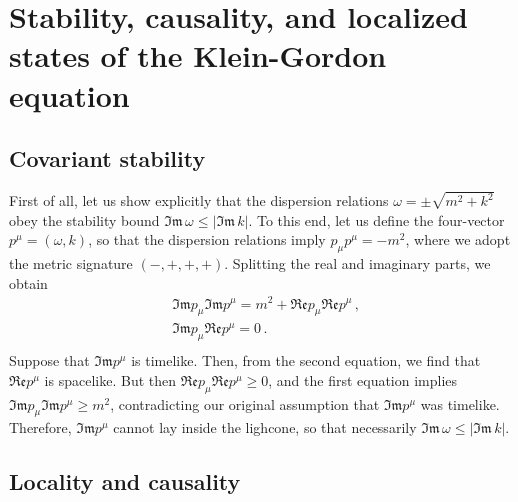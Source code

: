 \documentclass[prl, amsfonts, amssymb, amsmath, nofootinbib,reprint, showkeys, twoside,notitlepage]{revtex4-2}
\theoremstyle{definition}
\theoremstyle{theorem}
\theoremstyle{corollary}
\begin{document}
\newpage


\section{Stability, causality, and localized states of the Klein-Gordon equation}

\subsection{Covariant stability}

First of all, let us show explicitly that the dispersion relations $\omega{=}\pm \sqrt{m^2{+}k^2}$ obey the stability bound $\mathfrak{Im} \, \omega \leq |\mathfrak{Im} \, k|$. To this end, let us define the four-vector $p^\mu =(\omega,k)$, so that the dispersion relations imply $p_\mu p^\mu=-m^2$, where we adopt the metric signature $(-,+,+,+)$. Splitting the real and imaginary parts, we obtain
\begin{equation}
\begin{split}
& \mathfrak{Im}p_\mu \mathfrak{Im}p^\mu =m^2+\mathfrak{Re}p_\mu \mathfrak{Re}p^\mu \, ,  \\
& \mathfrak{Im}p_\mu \mathfrak{Re}p^\mu =0 \, . \\
\end{split}
\end{equation}
Suppose that $\mathfrak{Im}p^\mu$ is timelike. Then, from the second equation, we find that $\mathfrak{Re}p^\mu$ is spacelike. But then $\mathfrak{Re}p_\mu \mathfrak{Re}p^\mu \geq 0$, and the first equation implies $\mathfrak{Im}p_\mu \mathfrak{Im}p^\mu \geq m^2$, contradicting our original assumption that $\mathfrak{Im}p^\mu$ was timelike. Therefore, $\mathfrak{Im}p^\mu$ cannot lay inside the lighcone, so that necessarily $\mathfrak{Im} \, \omega  \leq |\mathfrak{Im} \, k|$.

\subsection{Locality and causality}
\end{document}
